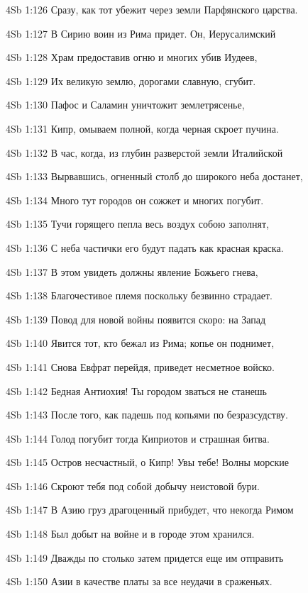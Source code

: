\vs 4Sb 1:126 Сразу, как тот убежит через земли Парфянского царства.

\vs 4Sb 1:127 В Сирию воин из Рима придет. Он, Иерусалимский 

\vs 4Sb 1:128 Храм предоставив огню и многих убив Иудеев, 

\vs 4Sb 1:129 Их великую землю, дорогами славную, сгубит.

\vs 4Sb 1:130 Пафос и Саламин уничтожит землетрясенье,

\vs 4Sb 1:131 Кипр, омываем полной, когда черная скроет пучина.

\vs 4Sb 1:132 В час, когда, из глубин разверстой земли Италийской 

\vs 4Sb 1:133 Вырвавшись, огненный столб до широкого неба достанет, 

\vs 4Sb 1:134 Много тут городов он сожжет и многих погубит. 

\vs 4Sb 1:135 Тучи горящего пепла весь воздух собою заполнят, 

\vs 4Sb 1:136 С неба частички его будут падать как красная краска.

\vs 4Sb 1:137 В этом увидеть должны явление Божьего гнева, 

\vs 4Sb 1:138 Благочестивое племя поскольку безвинно страдает. 

\vs 4Sb 1:139 Повод для новой войны появится скоро: на Запад 

\vs 4Sb 1:140 Явится тот, кто бежал из Рима; копье он поднимет, 

\vs 4Sb 1:141 Снова Евфрат перейдя, приведет несметное войско.

\vs 4Sb 1:142 Бедная Антиохия! Ты городом зваться не станешь 

\vs 4Sb 1:143 После того, как падешь под копьями по безразсудству. 

\vs 4Sb 1:144 Голод погубит тогда Киприотов и страшная битва.

\vs 4Sb 1:145 Остров несчастный, о Кипр! Увы тебе! Волны морские 

\vs 4Sb 1:146 Скроют тебя под собой  добычу неистовой бури.

\vs 4Sb 1:147 В Азию груз драгоценный прибудет, что некогда Римом 

\vs 4Sb 1:148 Был добыт на войне и в городе этом хранился. 

\vs 4Sb 1:149 Дважды по столько затем придется еще им отправить 

\vs 4Sb 1:150 Азии в качестве платы за все неудачи в сраженьях.

